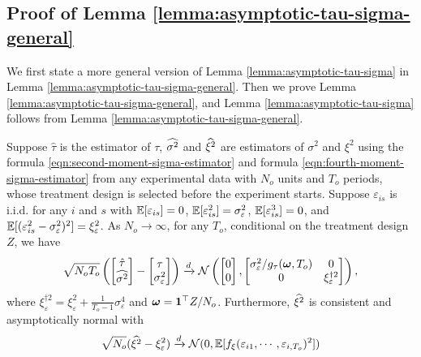 \subsection{Proof of Lemma \ref{lemma:asymptotic-tau-sigma-general}}



We first state a more general version of Lemma \ref{lemma:asymptotic-tau-sigma} in Lemma \ref{lemma:asymptotic-tau-sigma-general}. Then we prove Lemma \ref{lemma:asymptotic-tau-sigma-general}, and Lemma \ref{lemma:asymptotic-tau-sigma} follows from Lemma \ref{lemma:asymptotic-tau-sigma-general}.

\begin{lemma}\label{lemma:asymptotic-tau-sigma-general}
Suppose $\hat{\tau}$ is the \within estimator of $\tau$, $\widehat{\sigma^2}$ and $\widehat{\xi^2}$ are estimators of $\sigma^2$ and $\xi^2$ using the formula \eqref{eqn:second-moment-sigma-estimator} and formula \eqref{eqn:fourth-moment-sigma-estimator} from any experimental data with $N_o$ units and $T_o$ periods, whose treatment design is selected before the experiment starts. 
Suppose $\varepsilon_{is}$ is i.i.d. for any $i$ and $s$ with $\mathbb{E}[\varepsilon_{is}] = 0$, $\mathbb{E}[\varepsilon^2_{is}] = \sigma_\varepsilon^2$, $\mathbb{E}[\varepsilon^3_{is}] = 0$,  and $\mathbb{E}[(\varepsilon^2_{is} - \sigma^2_\varepsilon)^2] = \xi^2_{\varepsilon}$. As $N_o \rightarrow \infty$, for any  $T_o$, conditional on the treatment design $Z$, we have 
\[\sqrt{N_o T_o} \left(\begin{bmatrix} \hat{\tau} \\ \widehat{\sigma^2} \end{bmatrix}  - \begin{bmatrix} \tau \\ \sigma^2_\varepsilon  \end{bmatrix}\right)  \xrightarrow{d} \mathcal{N} \left(\begin{bmatrix} 0 \\ 0 \end{bmatrix}, \begin{bmatrix} \sigma_\varepsilon^2/g_\tau(\bm{\omega}, T_o) & 0 \\  0 & \xi_\varepsilon^{\dagger2} \end{bmatrix} \right), \]
where $\xi_\varepsilon^{\dagger2} = \xi^2_\varepsilon + \frac{1}{T_o-1} \sigma_\varepsilon^4$ and $\bm{\omega} = \bm{1}^\top Z/N_o$. Furthermore, $\widehat{\xi^2}$ is consistent and asymptotically normal with 
\begin{align*}
    \sqrt{N_o} (\estxisq - \xi_\varepsilon^2) \xrightarrow{d} \mathcal{N}(0, \+E[f_\xi(\varepsilon_{i1}, \cdots, \varepsilon_{i,T_o})^2])

\end{align*}
\end{lemma}
